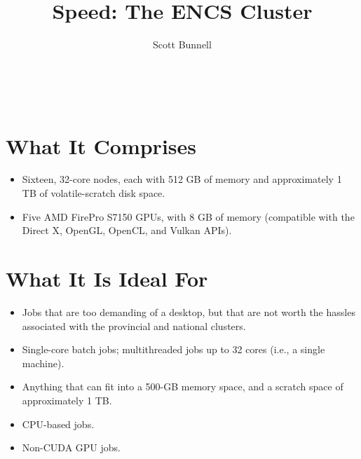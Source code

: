 \documentclass{easychair}
\begin{document}
%
\title{Speed: The ENCS Cluster}

%

%
\author{
    Scott Bunnell\\
    \\
    \\
    \\
}

%

\maketitle

\section{What It Comprises}

\begin{itemize}
\item
Sixteen, 32-core nodes, each with 512 GB of memory and approximately 1 TB of  volatile-scratch disk space. 
\item
Five AMD FirePro S7150 GPUs, with 8 GB of memory (compatible with the Direct X, OpenGL, OpenCL, and Vulkan APIs). 
\end{itemize}

\section{What It Is Ideal For}

\begin{itemize}
\item
Jobs that are too demanding of a desktop, but that are not worth the hassles  associated with the provincial and national clusters. 
\item
Single-core batch jobs; multithreaded jobs up to 32 cores (i.e., a single machine).
\item
Anything that can fit into a 500-GB memory space, and a scratch space of  approximately 1 TB. 
\item
CPU-based jobs. 
\item
Non-CUDA GPU jobs. 
\end{itemize}
\end{document}
